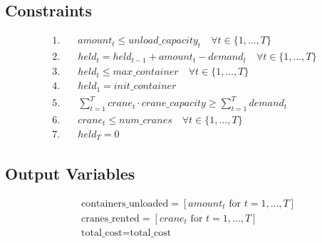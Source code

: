 \documentclass{article}
\begin{document}
\subsection*{Constraints}
\begin{align*}
1. & \quad amount_{t} \leq unload\_capacity_{t} \quad \forall t \in \{1, \ldots, T\} \\
2. & \quad held_{t} = held_{t-1} + amount_{t} - demand_{t} \quad \forall t \in \{1, \ldots, T\} \\
3. & \quad held_{t} \leq max\_container \quad \forall t \in \{1, \ldots, T\} \\
4. & \quad held_{1} = init\_container \\
5. & \quad \sum_{t=1}^{T} crane_{t} \cdot crane\_capacity \geq \sum_{t=1}^{T} demand_{t} \\
6. & \quad crane_{t} \leq num\_cranes \quad \forall t \in \{1, \ldots, T\} \\
7. & \quad held_{T} = 0
\end{align*}

\subsection*{Output Variables}
\begin{align*}
& \text{containers\_unloaded} = [amount_{t} \text{ for } t = 1, \ldots, T] \\
& \text{cranes\_rented} = [crane_{t} \text{ for } t = 1, \ldots, T] \\
& \text{total\_cost} = \text{total\_cost}
\end{align*}
\end{document}
